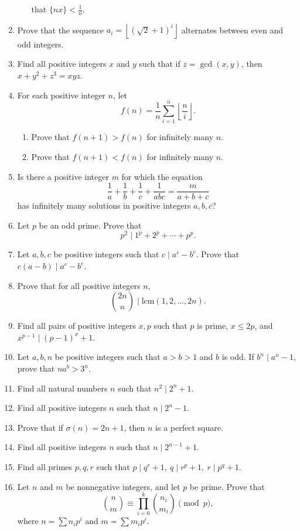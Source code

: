 \documentclass{article}
\newcommand\lcm{\mathrm{lcm}}
\begin{document}
\begin{enumerate}
\begin{enumerate}
        that $\{nx\}<\frac 1n$.
    \end{enumerate}
  \item Prove that the sequence $a_i=\left\lfloor(\sqrt 2+1)^i\right\rfloor$
    alternates between even and odd integers.
  \item Find all positive integers $x$ and $y$ such that if $z=\gcd(x,y)$, then
    $x+y^2+z^3=xyz$.
  \item For each positive integer $n$, let
    \[f(n)=\frac1n\sum_{i=1}^n \left\lfloor\frac ni\right\rfloor.\]
    \begin{enumerate}
      \item Prove that $f(n+1)>f(n)$ for infinitely many $n$.
      \item Prove that $f(n+1)<f(n)$ for infinitely many $n$.
    \end{enumerate}
  \item Is there a positive integer $m$ for which the equation
    \[\frac1a+\frac1b+\frac1c+\frac1{abc}=\frac m{a+b+c}\]
    has infinitely many solutions in positive integers $a,b,c$?
  \item Let $p$ be an odd prime. Prove that
    \[p^2\mid 1^p+2^p+\cdots+p^p.\]
  \item Let $a,b,c$ be positive integers such that $c\mid a^c-b^c$. Prove that
    $c(a-b)\mid a^c-b^c$.
  \item Prove that for all positive integers $n$,
    \[\binom{2n}n\mid\lcm(1,2,\ldots,2n).\]
  \item Find all pairs of positive integers $x,p$ such that $p$ is prime, $x\le
    2p$, and $x^{p-1}\mid (p-1)^x+1$.
  \item Let $a,b,n$ be positive integers such that $a>b>1$ and $b$ is odd. If
    $b^n\mid a^n-1$, prove that $na^b>3^n$.
  \item Find all natural numbers $n$ such that $n^2\mid 2^n+1$.
  \item Find all positive integers $n$ such that $n\mid 2^n-1$.
  \item Prove that if $\sigma(n)=2n+1$, then $n$ is a perfect square.
  \item Find all positive integers $n$ such that $n\mid 2^{n-1}+1$.
  \item Find all primes $p,q,r$ such that $p\mid q^r+1,\ q\mid r^p+1,\ r\mid
    p^q+1$.
  \item Let $n$ and $m$ be nonnegative integers, and let $p$ be prime. Prove
    that
    \[\binom nm\equiv\prod_{i=0}^k\binom{n_i}{m_i}\pmod p,\]
    where $n=\sum n_i p^i$ and $m=\sum m_i p^i$.

\end{enumerate}
\end{document}
